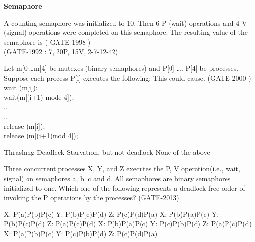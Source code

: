 \centerline{\textbf{ \LARGE Semaphore }}




\begin{questyle}

  \question  A counting semaphore was initialized to 10. Then 6 P (wait) operations and 4 V (signal) operations were completed on this semaphore. The resulting value of the semaphore is ( GATE-1998 )
  \\ (GATE-1992 :  7, 20P, 15V, 2-7-12-42)
  \begin{choices}
  \end{choices}

  \end{questyle}



\begin{questyle}

  \question   Let m[0]…m[4] be mutexes (binary semaphores) and P[0] …. P[4] be processes.
              Suppose each process P[i] executes the following: This could cause. (GATE-2000 ) \\
              wait (m[i]); \\
              wait(m[(i+1) mode 4]); \\
              ..\\
              ..\\
              release (m[i]);\\
              release (m[(i+1)mod 4]);

  \begin{oneparchoices}
    \choice Thrashing
    \choice Deadlock
    \choice Starvation, but not deadlock
    \choice None of the above
  \end{oneparchoices}

  \end{questyle}



\begin{questyle}

  \question Three concurrent processes X, Y, and Z  executes the P, V operation(i.e., wait, signal)
            on semaphores a, b, c and d. All semaphores are binary semaphores initialized to one.
            Which one of the following represents a deadlock-free order of invoking the P operations
            by the processes? (GATE-2013)

  \begin{choices}
    \choice X: P(a)P(b)P(c) \qquad  Y: P(b)P(c)P(d) \qquad  Z: P(c)P(d)P(a)
    \choice X: P(b)P(a)P(c) \qquad  Y: P(b)P(c)P(d) \qquad  Z: P(a)P(c)P(d)
    \choice X: P(b)P(a)P(c) \qquad  Y: P(c)P(b)P(d) \qquad  Z: P(a)P(c)P(d)
    \choice X: P(a)P(b)P(c) \qquad  Y: P(c)P(b)P(d) \qquad  Z: P(c)P(d)P(a)
  \end{choices}

  \end{questyle}




